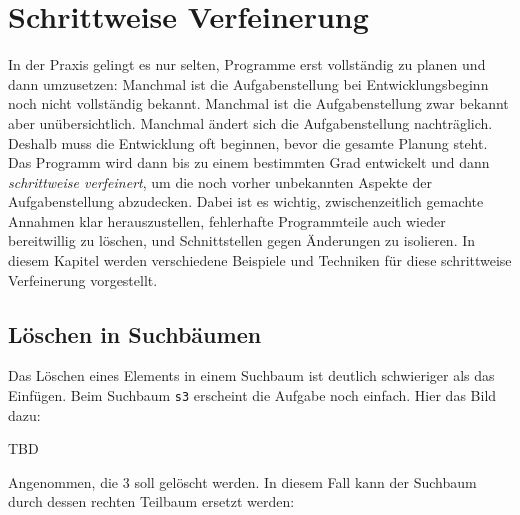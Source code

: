 
\chapter{Schrittweise Verfeinerung}
\label{cha:iterative-refinement}

 In
der Praxis gelingt es nur selten, Programme erst vollständig zu planen
und dann umzusetzen: Manchmal ist die Aufgabenstellung bei
Entwicklungsbeginn noch nicht vollständig bekannt.  Manchmal ist die
Aufgabenstellung zwar bekannt aber unübersichtlich. Manchmal ändert
sich die Aufgabenstellung nachträglich.  Deshalb muss die Entwicklung
oft beginnen, bevor die gesamte Planung steht.  Das Programm wird dann
bis zu einem bestimmten Grad entwickelt und dann \textit{schrittweise
  verfeinert}, um die noch vorher unbekannten Aspekte der
Aufgabenstellung abzudecken.  Dabei ist es wichtig, zwischenzeitlich
gemachte Annahmen klar herauszustellen, fehlerhafte Programmteile auch
wieder bereitwillig zu löschen, und Schnittstellen gegen Änderungen zu
isolieren.  In diesem Kapitel werden verschiedene Beispiele und
Techniken für diese schrittweise Verfeinerung vorgestellt.

\section{Löschen in Suchbäumen}
\label{sec:search-tree-delete}

Das Löschen eines Elements in einem Suchbaum ist deutlich schwieriger
als das Einfügen.  Beim Suchbaum \texttt{s3} erscheint die Aufgabe
noch einfach.  Hier das Bild dazu:
%

TBD

% 
Angenommen, die 3 soll gelöscht werden. In diesem Fall kann der
Suchbaum durch dessen rechten Teilbaum ersetzt werden:
%

